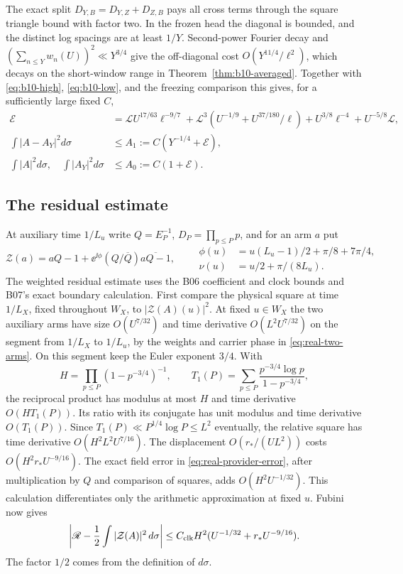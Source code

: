 The exact split \(D_{Y,B}=D_{Y,Z}+D_{Z,B}\) pays all cross
terms through the square triangle bound with factor two.
In the frozen head the diagonal is bounded, and the distinct
log spacings are at least \(1/Y\). Second-power Fourier decay
and \((\sum_{n\le Y}w_n(U))^2\ll Y^{3/4}\) give the
off-diagonal cost \(O(Y^{11/4}/\ell^2)\), which decays on the
short-window range in Theorem~\ref{thm:b10-averaged}.
Together with \eqref{eq:b10-high}, \eqref{eq:b10-low}, and the
freezing comparison this gives, for a sufficiently large fixed \(C\),
\begin{align}
 \mathcal E&=\mathcal L U^{17/63}\ell^{-9/7}
      +\mathcal L^3(U^{-1/9}+U^{37/180}/\ell)
      +U^{3/8}\ell^{-4}+U^{-5/8}\mathcal L,\nonumber\\
 \int |A-A_Y|^2d\sigma&\le A_1:=C(Y^{-1/4}+\mathcal E),\nonumber\\
 \int |A|^2d\sigma,\quad\int |A_Y|^2d\sigma
   &\le A_0:=C(1+\mathcal E).
 \label{eq:b10-norms}
\end{align}

\subsection{The residual estimate}
At auxiliary time \(1/L_u\) write \(Q=E_P^{-1}\), \(D_P=\prod_{p\le P}p\),
and for an arm \(a\) put
\[
 \mathcal Z(a)=aQ-1+\ee^{\ii\phi}(Q/\overline Q)\overline{aQ-1},
 \qquad
 \begin{aligned}
 \phi(u)&=u(L_u-1)/2+\pi/8+7\pi/4,\\
 \nu(u)&=u/2+\pi/(8L_u).
 \end{aligned}
\]
The weighted residual estimate uses the B06 coefficient and clock
bounds \cite{GNPRSWeightedEulerLedger} and B07's exact boundary
calculation. First compare the physical square at time \(1/L_X\),
fixed throughout \(W_X\), to \(|\mathcal Z(A)(u)|^2\).
At fixed \(u\in W_X\) the two auxiliary arms have size \(O(U^{7/32})\)
and time derivative \(O(L^2U^{7/32})\) on the segment from \(1/L_X\)
to \(1/L_u\), by the weights and carrier phase in
\eqref{eq:real-two-arms}. On this segment keep the Euler exponent
\(3/4\). With
\[
 H=\prod_{p\le P}(1-p^{-3/4})^{-1},\qquad
 T_1(P)=\sum_{p\le P}\frac{p^{-3/4}\log p}{1-p^{-3/4}},
\]
the reciprocal product has modulus at most \(H\) and time derivative
\(O(HT_1(P))\). Its ratio with its conjugate has unit modulus and
time derivative \(O(T_1(P))\). Since \(T_1(P)\ll P^{1/4}\log P\le L^2\)
eventually, the relative square has time derivative
\(O(H^2L^2 U^{7/16})\). The displacement
\(O(r_* /(UL^2))\) costs \(O(H^2r_*U^{-9/16})\).
The exact field error in \eqref{eq:real-provider-error}, after
multiplication by \(Q\) and comparison of squares, adds
\(O(H^2U^{-1/32})\). This calculation differentiates only the
arithmetic approximation at fixed \(u\). Fubini now gives
\begin{equation}\label{eq:b10-fubini}
 \left|\mathscr R-\frac12\int|\mathcal Z(A)|^2\,d\sigma\right|
 \le C_{\rm clk}H^2(U^{-1/32}+r_*U^{-9/16}).
\end{equation}
The factor \(1/2\) comes from the definition of \(d\sigma\).

